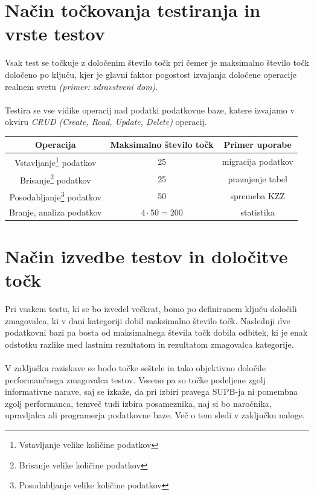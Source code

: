 \documentclass[a4paper,11pt]{report}
\begin{document}
\paragraph{}

\section{Način točkovanja testiranja in vrste testov}

Vsak test se točkuje z določenim število točk pri čemer je maksimalno število točk določeno po ključu, kjer je glavni faktor pogostost izvajanja določene operacije realnem svetu \textit{(primer: zdravstveni dom)}.
\\\\
Testira se vse vidike operacij nad podatki podatkovne baze, katere izvajamo v okviru \textit{CRUD (Create, Read, Update, Delete)} operacij.

\begin{center}
   \begin{tabular}{||c|c|c||}
      \hline
      \textbf{Operacija} & \textbf{Maksimalno število točk} & \textbf{Primer uporabe}\\
      \hline
      \hline
      Vstavljanje\footnote{Vstavljanje velike količine podatkov} podatkov & 25 & migracija podatkov\\
      Brisanje\footnote{Brisanje velike količine podatkov} podatkov & 25 & praznjenje tabel\\
      Posodabljanje\footnote{Posodabljanje velike količine podatkov} podatkov & 50 & spremeba KZZ \\
      Branje, analiza podatkov & \(4 \cdot 50 = 200\) & statistika\\
      \hline
   \end{tabular}
\end{center}

\section{Način izvedbe testov in določitve točk}
Pri vsakem testu, ki se bo izvedel večkrat, bomo po definiranem ključu določili zmagovalca, ki v dani kategoriji dobil maksimalno število točk. Naslednji dve podatkovni bazi pa bosta od maksimalnega števila točk dobila odbitek, ki je enak odstotku razlike med lastnim rezultatom in rezultatom zmagovalca kategorije. 
\\\\
V zaključku raziskave se bodo točke seštele in tako objektivno določile performančnega zmagovalca testov. Vseeno pa so točke podeljene zgolj informativne narave, saj se izkaže, da pri izbiri pravega SUPB-ja ni pomembna zgolj performanca, temveč tudi izbira posameznika, naj si bo naročnika, upravljalca ali programerja podatkovne baze. Več o tem sledi v zaključku naloge. 
\end{document}
